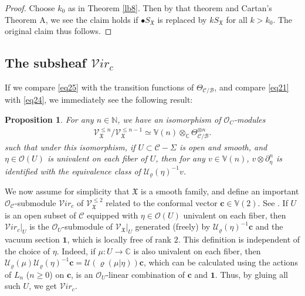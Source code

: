 \documentclass[11pt,b5paper,notitlepage]{article}
\theoremstyle{definition}
\theoremstyle{plain}
\newtheorem{pp}[df]{Proposition}
\newcommand{\fk}{\mathfrak}
\newcommand{\mc}{\mathcal}
\newcommand{\id}{\mathbf{1}}
\newcommand{\scr}{\mathscr}
\newcommand{\SX}{S_{\fk X}}
\newcommand{\blt}{\bullet}
\newcommand{\Vbb}{\mathbb V}
\newcommand{\Cbb}{\mathbb C}
\newcommand{\Nbb}{\mathbb N}
\newcommand{\cbf}{\mathbf c}
\newcommand{\svir}{\mathcal V\!\mathit{ir}}
\numberwithin{equation}{section}
\begin{document}
\begin{proof}
Choose $k_0$ as in Theorem \ref{lb8}. Then by that theorem  and Cartan's Theorem A, we see the claim holds if $\blt\SX$ is replaced by $k\SX$ for all $k>k_0$. The original claim thus follows.
\end{proof}







\subsection*{The subsheaf $\svir_c$}

If we compare \eqref{eq25} with the transition functions of $\Theta_{\mc C/\mc B}$, and  compare \eqref{eq21} with \eqref{eq24}, we immediately see the following result:

\begin{pp}\label{lb12}
For any $n\in\Nbb$, we have an isomorphism of  $\scr O_C$-modules
	\begin{align}
	\scr V_{\fk X}^{\leq n}/\scr V_{\fk X}^{\leq n-1}\simeq\Vbb(n)\otimes_{\Cbb}\Theta_{\mc C/\mc B}^{\otimes n}.
	\end{align}
such that under this isomorphism, if $U\subset \mc C-\Sigma$ is open and smooth, and $\eta\in\scr O(U)$ is univalent on each fiber of $U$, then for any $v\in\Vbb(n)$, $v\otimes \partial_\eta^n$ is identified with the equivalence class of $\mc U_\varrho(\eta)^{-1}v$.
\end{pp}

We now assume for simplicity that $\fk X$ is a smooth family, and define an important $\scr O_{\mc C}$-submodule $\svir_c$ \index{Virc@$\svir_c$} of $\scr V_{\fk X}^{\leq 2}$ related to the conformal vector $\cbf\in\Vbb(2)$. See \cite[Sec. 8.2]{FB04}. If $U$ is an open subset of $\mc C$ equipped with  $\eta\in\scr O(U)$ univalent on each fiber, then $\svir_c|_U$ is the  $\scr O_U$-submodule of $\scr V_{\fk X}|_U$ generated (freely) by $\mc U_\varrho(\eta)^{-1}\cbf$ and the vacuum section $\id$, which is locally free of rank $2$. This definition is independent of the choice of $\eta$. Indeed, if $\mu:U\rightarrow\Cbb$ is also univalent on each fiber, then $\mc U_\varrho(\mu)\mc U_\varrho(\eta)^{-1}\cbf=\mc U(\varrho(\mu|\eta))\cbf$, which can be calculated using the actions of $L_n$ ($n\geq 0$) on $\cbf$, is an $\scr O_U$-linear combination of $\cbf$ and $\id$. Thus, by gluing all such $U$, we get $\svir_c$.
\end{document}
